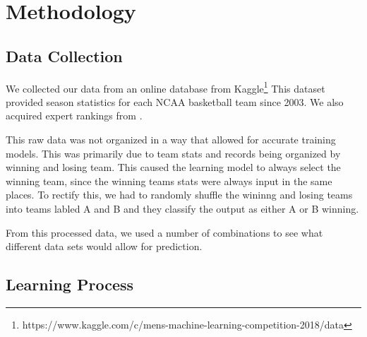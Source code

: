 \section{Methodology}

\subsection{Data Collection}
We collected our data from an online database from Kaggle\footnote{https://www.kaggle.com/c/mens-machine-learning-competition-2018/data}
This dataset provided season statistics for each NCAA basketball team since 2003.
We also acquired expert rankings from .

This raw data was not organized in a way that allowed for accurate training models.
This was primarily due to team stats and records being organized by winning and losing team.
This caused the learning model to always select the winning team, since the winning teams stats were always input in the same places.
To rectify this, we had to randomly shuffle the wininng and losing teams into teams labled A and B and they classify the output as either A or B winning.

From this processed data, we used a number of combinations to see what different data sets would allow for prediction.

\subsection{Learning Process}

